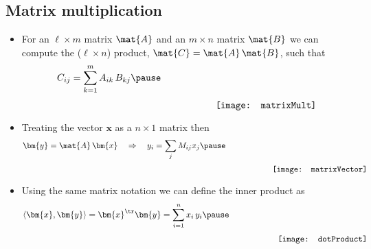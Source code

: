 \begin{slide}
\section[-2]{Matrix multiplication}

\begin{PauseHighLight}
  \begin{itemize}
  \item For an $\ell \times m$ matrix $\mat{A}$ and an $m \times n$
    matrix $\mat{B}$ we can compute the ($\ell\times n$) product, $\mat{C} =
    \mat{A}\,\mat{B}$, such that
    \begin{align*}
      C_{ij} = \sum_{k=1}^m A_{ik}\,B_{kj}\pause \hspace{2cm}
      \raisebox{-1cm}{\texttt{[image: matrixMult]}}
    \end{align*}
  \item Treating the vector $\bm{x}$ as a $n\times1$ matrix then
    \begin{align*}
      \bm{y} = \mat{A}\, \bm{x} \quad \Rightarrow \quad y_i = \sum_{j}
      M_{ij} x_j\pause \hspace{2cm}
      \raisebox{-1cm}{\texttt{[image: matrixVector]}}
    \end{align*}
  \item Using the same matrix notation we can define the inner product
    as
    \begin{align*}
      \langle \bm{x}, \bm{y} \rangle = \bm{x}^\tr \bm{y} = \sum_{i=1}^n
      x_i\,y_i \pause \hspace{2cm}
      \raisebox{-1cm}{\texttt{[image: dotProduct]}}
    \end{align*}
  \end{itemize}
\end{PauseHighLight}

\end{slide}


